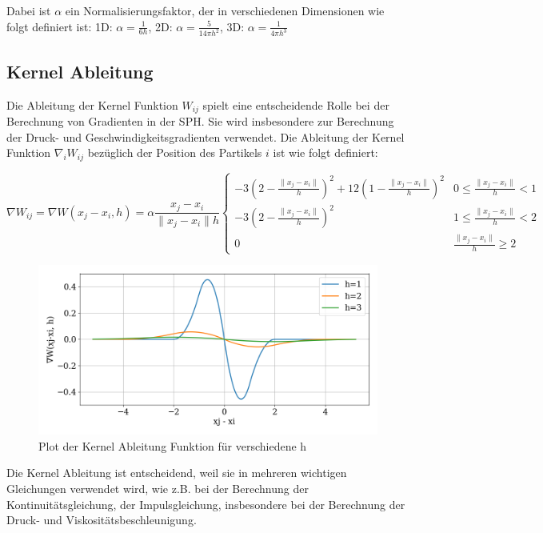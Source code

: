 \documentclass[a4paper, 12pt]{article}
\begin{document}
Dabei ist \(\alpha\) ein Normalisierungsfaktor, der in verschiedenen Dimensionen wie folgt definiert ist:
1D: \(\alpha = \frac{1}{6h}\), 2D: \(\alpha = \frac{5}{14\pi h^2}\), 3D: \(\alpha = \frac{1}{4\pi h^3}\)

\subsection{Kernel Ableitung}
Die Ableitung der Kernel Funktion $W_{ij}$ \cite{professor_presentation_2024} spielt eine entscheidende Rolle bei der Berechnung von Gradienten in der SPH. Sie wird insbesondere zur Berechnung der Druck- und Geschwindigkeitsgradienten verwendet. Die Ableitung der Kernel Funktion $\nabla_i W_{ij}$ bezüglich der Position des Partikels $i$ ist wie folgt definiert:

\begin{equation*}
	\nabla W_{ij} = \nabla W(x_j - x_i, h) = \alpha \frac{x_j - x_i}{\|x_j - x_i\|h} 
	\begin{cases} 
	-3(2-\frac{\|x_j - x_i\|}{h})^2 + 12(1-\frac{\|x_j - x_i\|}{h})^2 & 0 \leq \frac{\|x_j - x_i\|}{h} < 1 \\ 
	-3(2-\frac{\|x_j - x_i\|}{h})^2 & 1 \leq \frac{\|x_j - x_i\|}{h} < 2 \\ 
	0 & \frac{\|x_j - x_i\|}{h} \geq 2 
	\end{cases}
\end{equation*}	

\begin{figure}[H]
	\centering
	\includegraphics[width=.85\textwidth]{graphics/KernelDerivPlot.png}
	\caption{Plot der Kernel Ableitung Funktion für verschiedene h}
\end{figure}

Die Kernel Ableitung ist entscheidend, weil sie in mehreren wichtigen Gleichungen verwendet wird, wie z.B. bei der Berechnung der Kontinuitätsgleichung, der Impulsgleichung, insbesondere bei der Berechnung der Druck- und Viskositätsbeschleunigung.
\end{document}
